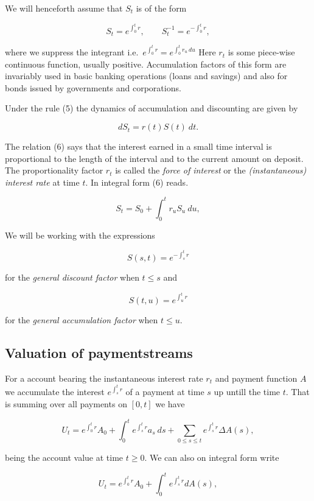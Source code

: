 \documentclass[a4paper,10pt,openany]{book}
\begin{document}
We will henceforth assume that \(S_t\) is of the form

\[
S_t=e^{\int_0^t r},\qquad S_t^{-1}=e^{-\int_0^t r},\tag{5}
\]

where we suppress the integrant i.e.~\(e^{\int_0^t r}=e^{\int_0^t r_u\ du}\) Here \(r_t\) is some piece-wise continuous function, usually positive. Accumulation factors of this form are invariably used in basic banking operations (loans and savings) and also for bonds issued by governments and corporations.

Under the rule (5) the dynamics of accumulation and discounting are given by

\[
dS_t=r(t)S(t)\ dt.\tag{6}
\]

The relation (6) says that the interest earned in a small time interval is proportional to the length of the interval and to the current amount on deposit. The proportionality factor \(r_t\) is called the \emph{force of interest} or the \emph{(instantaneous) interest rate} at time \(t\). In integral form (6) reads.

\[
S_t=S_0+\int_0^tr_uS_u\ du,\tag{7}
\]

We will be working with the expressions

\[
S(s,t)=e^{-\int_s^tr}\tag{8}
\]

for the \emph{general discount factor} when \(t \le s\) and

\[
S(t,u)=e^{\int_u^tr}\tag{9}
\]

for the \emph{general accumulation factor} when \(t\le u\).

\hypertarget{valuation-of-paymentstreams}{%
\subsection{Valuation of paymentstreams}\label{valuation-of-paymentstreams}}

For a account bearing the instantaneous interest rate \(r_t\) and payment function \(A\) we accumulate the interest \(e^{\int_s^t r}\) of a payment at time \(s\) up untill the time \(t\). That is summing over all payments on \([0,t]\) we have

\[
U_t=e^{\int_0^tr}A_0+\int_0^te^{\int_s^tr}a_s\ ds+\sum_{0\le s\le t}e^{\int_s^tr}\Delta A(s),\tag{10}
\]

being the account value at time \(t\ge 0\). We can also on integral form write

\[
U_t=e^{\int_0^tr}A_0+\int_0^te^{\int_s^tr}dA(s),\tag{11}
\]
\end{document}
